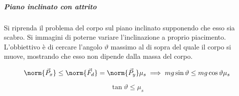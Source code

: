 \subparagraph{Piano inclinato con attrito} Si riprenda il problema del corpo sul piano inclinato supponendo che esso sia scabro. Si immagini di poterne variare l'inclinazione a proprio piacimento. L'obbiettivo è di cercare l'angolo $\vartheta$ massimo al di sopra del quale il corpo si muove, mostrando che esso non dipende dalla massa del corpo.

\[
	\norm{\vec{P}_x} \le \norm{\vec{F}_d} = \norm{\vec{P}_y}\mu_s 	\implies mg\sin\vartheta\le mg\cos\vartheta \mu_s
\]

\begin{equation}
	\label{eqn:attrito}
	\tan\vartheta \le \mu_s
\end{equation}

\begin{figure}[htpb]
	\centering


	\begin{tikzpicture}[x=0.75pt,y=0.75pt,yscale=-1,xscale=1]


\end{tikzpicture}
\end{figure}
